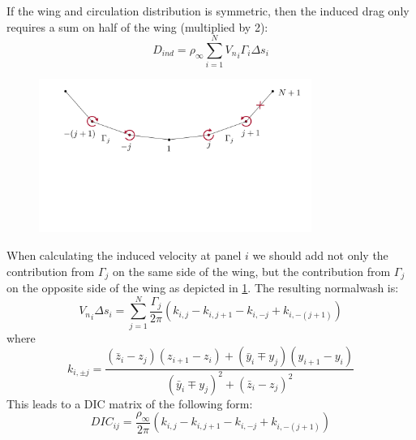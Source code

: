 \documentclass{article}
\begin{document}
If the wing and circulation distribution is symmetric, then the induced drag only requires a sum on half of the wing (multiplied by 2):
\begin{equation}
D_{ind} = \rho_\infty \sum_{i=1}^N {V_n}_i \Gamma_i  \Delta s_i
\end{equation}


\begin{figure}[htbp]
\centering
\includegraphics[width=3.5in]{figs/induced2}
\caption{}
\label{fig:induced2}
\end{figure}

When calculating the induced velocity at panel $i$ we should add not only the contribution from $\Gamma_j$ on the same side of the wing, but the contribution from $\Gamma_j$ on the opposite side of the wing as depicted in \cref{fig:induced2}.  The resulting normalwash is:
\begin{equation}
{V_n}_i \Delta s_i = \sum_{j=1}^N 
\frac{\Gamma_j}{2\pi} \left( 
k_{i,j} - k_{i, j+1} - k_{i, -j} + k_{i, -(j+1)}
\right)
\end{equation}
where
\begin{equation}
k_{i,\pm j} = \frac{(\bar z_i - z_j) (z_{i+1} - z_i) + (\bar y_i \mp y_j) (y_{i+1} - y_i)}{(\bar y_i \mp y_j)^2 + (\bar z_i - z_j)^2} 
\end{equation}
This leads to a DIC matrix of the following form:
\begin{equation}
DIC_{ij} = \frac{\rho_\infty}{2\pi} \left(k_{i,j} - k_{i, j+1} - k_{i, -j} + k_{i, -(j+1)}
\right)
\end{equation}



\end{document}
